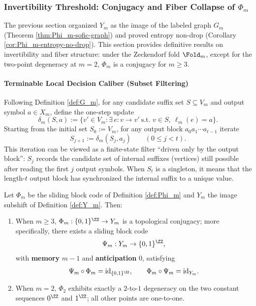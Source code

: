 \subsubsection{Invertibility Threshold: Conjugacy and Fiber Collapse of \texorpdfstring{$\Phi_m$}{Phi\_m}}\label{subsec:Phi_m-conjugacy}

The previous section organized $Y_m$ as the image of the labeled graph $G_m$ (Theorem \ref{thm:Phi_m-sofic-graph}) and proved entropy non-drop (Corollary \ref{cor:Phi_m-entropy-no-drop}).
This section provides definitive results on invertibility and fiber structure: under the Zeckendorf fold $\Fold_m$, except for the two-point degeneracy at $m=2$, $\Phi_m$ is a conjugacy for $m\ge 3$.

\paragraph{Terminable Local Decision Caliber (Subset Filtering)}
Following Definition \ref{def:G_m}, for any candidate suffix set $S\subseteq V_m$ and output symbol $a\in X_m$, define the one-step update
$$
\delta_m(S,a):=\{v'\in V_m:\exists\,e:v\to v'\ \text{s.t. }v\in S,\ \ell_m(e)=a\}.
$$
Starting from the initial set $S_0:=V_m$, for any output block $a_0a_1\cdots a_{t-1}$ iterate
$$
S_{j+1}:=\delta_m(S_j,a_j)\qquad(0\le j<t).
$$
This iteration can be viewed as a finite-state filter ``driven only by the output block'': $S_j$ records the candidate set of internal suffixes (vertices) still possible after reading the first $j$ output symbols.
When $S_t$ is a singleton, it means that the length-$t$ output block has synchronized the internal suffix to a unique value.

\begin{theorem}\label{thm:Phi_m-conjugacy-threshold}
Let $\Phi_m$ be the sliding block code of Definition \ref{def:Phi_m} and $Y_m$ the image subshift of Definition \ref{def:Y_m}.
Then:
\begin{enumerate}
  \item When $m\ge 3$, $\Phi_m:\{0,1\}^{\ZZ}\to Y_m$ is a topological conjugacy; more specifically, there exists a sliding block code
  $$
  \Psi_m:Y_m\to\{0,1\}^{\ZZ},
  $$
  with \textbf{memory} $m-1$ and \textbf{anticipation} $0$, satisfying
  $$
  \Psi_m\circ\Phi_m=\mathrm{id}_{\{0,1\}^{\ZZ}},\qquad
  \Phi_m\circ\Psi_m=\mathrm{id}_{Y_m}.
  $$
  \item When $m=2$, $\Phi_2$ exhibits exactly a $2$-to-$1$ degeneracy on the two constant sequences $0^{\ZZ}$ and $1^{\ZZ}$; all other points are one-to-one.
\end{enumerate}
\end{theorem}

